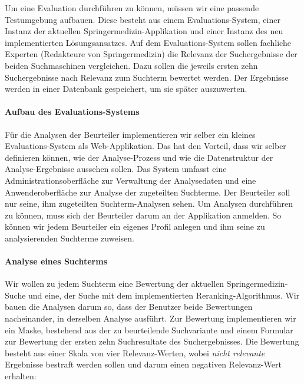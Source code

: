 Um eine Evaluation durchführen zu können, müssen wir eine passende Testumgebung aufbauen. Diese besteht aus einem Evaluations-System, einer Instanz der aktuellen Springermedizin-Applikation und einer Instanz des neu implementierten Lösungsansatzes. Auf dem Evaluations-System sollen fachliche Experten (Redakteure von Springermedizin) die Relevanz der Suchergebnisse der beiden Suchmaschinen vergleichen. Dazu sollen die jeweils ersten zehn Suchergebnisse nach Relevanz zum Suchterm bewertet werden. Der Ergebnisse werden in einer Datenbank gespeichert, um sie später auszuwerten. 

\paragraph{Aufbau des Evaluations-Systems}
Für die Analysen der Beurteiler implementieren wir selber ein kleines Evaluations-System als Web-Applikation. Das hat den Vorteil, dass wir selber definieren können, wie der Analyse-Prozess und wie die Datenstruktur der Analyse-Ergebnisse aussehen sollen. Das System umfasst eine Administrationsoberfläche zur Verwaltung der Analysedaten und eine Anwenderoberfläche zur Analyse der zugeteilten Suchterme. Der Beurteiler soll nur seine, ihm zugeteilten Suchterm-Analysen sehen. Um Analysen durchführen zu können, muss sich der Beurteiler darum an der Applikation anmelden. So können wir jedem Beurteiler ein eigenes Profil anlegen und ihm seine zu analysierenden Suchterme zuweisen. 

\paragraph{Analyse eines Suchterms}
Wir wollen zu jedem Suchterm eine Bewertung der aktuellen Springermedizin-Suche und eine, der Suche mit dem implementierten Reranking-Algorithmus. Wir bauen die Analysen darum so, dass der Benutzer beide Bewertungen nacheinander, in derselben Analyse ausführt. Zur Bewertung implementieren wir ein Maske, bestehend aus der zu beurteilende Suchvariante und einem Formular zur Bewertung der ersten zehn Suchresultate des Suchergebnisses. Die Bewertung besteht aus einer Skala von vier Relevanz-Werten, wobei \textit{nicht relevante} Ergebnisse bestraft werden sollen und darum einen negativen Relevanz-Wert erhalten:

